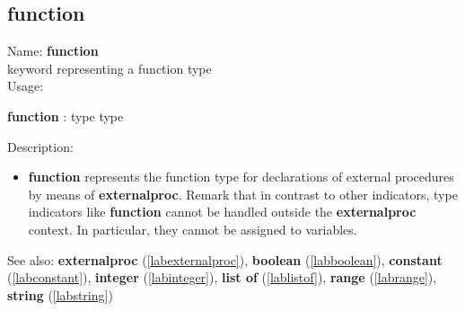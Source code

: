 \subsection{function}
\label{labfunction}
\noindent Name: \textbf{function}\\
keyword representing a \textsf{function} type \\

\noindent Usage: 
\begin{center}
\textbf{function} : \textsf{type type}\\
\end{center}
\noindent Description: \begin{itemize}

\item \textbf{function} represents the \textsf{function} type for declarations
   of external procedures by means of \textbf{externalproc}.
   Remark that in contrast to other indicators, type indicators like
   \textbf{function} cannot be handled outside the \textbf{externalproc} context.  In
   particular, they cannot be assigned to variables.
\end{itemize}
See also: \textbf{externalproc} (\ref{labexternalproc}), \textbf{boolean} (\ref{labboolean}), \textbf{constant} (\ref{labconstant}), \textbf{integer} (\ref{labinteger}), \textbf{list of} (\ref{lablistof}), \textbf{range} (\ref{labrange}), \textbf{string} (\ref{labstring})
